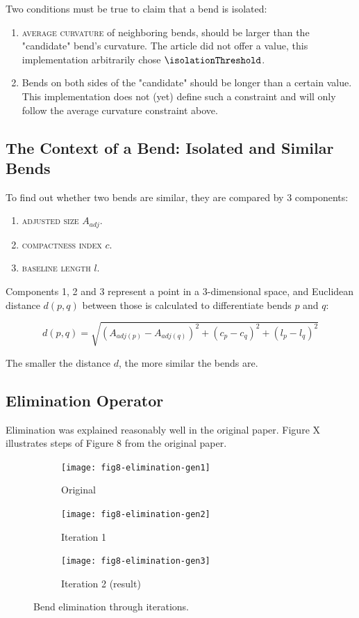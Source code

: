 \documentclass[a4paper]{article}
\begin{document}
Two conditions must be true to claim that a bend is isolated:

\begin{enumerate}
    \item \textsc{average curvature} of neighboring bends, should be larger
        than the "candidate" bend's curvature. The article did not offer a
        value, this implementation arbitrarily chose $\isolationThreshold$.

    \item Bends on both sides of the "candidate" should be longer than a
        certain value. This implementation does not (yet) define such a
        constraint and will only follow the average curvature constraint above.
\end{enumerate}

\subsection{The Context of a Bend: Isolated and Similar Bends}

To find out whether two bends are similar, they are compared by 3 components:

\begin{enumerate}
  \item \textsc{adjusted size} $A_{adj}$.
  \item \textsc{compactness index} $c$.
  \item \textsc{baseline length} $l$.
\end{enumerate}

Components 1, 2 and 3 represent a point in a 3-dimensional space, and Euclidean
distance $d(p,q)$ between those is calculated to differentiate bends $p$ and
$q$:

\[
  d(p,q) = \sqrt{(A_{adj(p)}-A_{adj(q)})^2 +
                   (c_p-c_q)^2 +
                   (l_p-l_q)^2}
\]

The smaller the distance $d$, the more similar the bends are.

\subsection{Elimination Operator}

Elimination was explained reasonably well in the original paper. Figure X
illustrates steps of Figure 8 from the original paper.

\begin{figure}[ht]
    \centering
    \begin{subfigure}[b]{.7\textwidth}
        \texttt{[image: fig8-elimination-gen1]}
        \caption{Original}
    \end{subfigure}
    \begin{subfigure}[b]{.7\textwidth}
        \texttt{[image: fig8-elimination-gen2]}
        \caption{Iteration 1}
    \end{subfigure}
    \begin{subfigure}[b]{.7\textwidth}
        \texttt{[image: fig8-elimination-gen3]}
        \caption{Iteration 2 (result)}
    \end{subfigure}
    \caption{Bend elimination through iterations.}
    \label{fig:elimination-through-iterations}
\end{figure}
\end{document}
